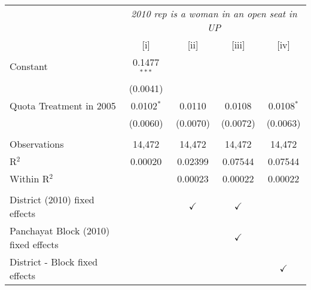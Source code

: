 
\begingroup
\centering
\begin{tabular}{lcccc}
   \toprule
    & \multicolumn{4}{c}{\textit{2010 rep is a woman in an open seat in UP}}\\
                                        & [i]            & [ii]          & [iii]         & [iv]\\  
   \midrule 
   Constant                             & 0.1477$^{***}$ &               &               &   \\   
                                        & (0.0041)       &               &               &   \\   
   Quota Treatment in 2005              & 0.0102$^{*}$   & 0.0110        & 0.0108        & 0.0108$^{*}$\\   
                                        & (0.0060)       & (0.0070)      & (0.0072)      & (0.0063)\\   
    \\
   Observations                         & 14,472         & 14,472        & 14,472        & 14,472\\  
   R$^2$                                & 0.00020        & 0.02399       & 0.07544       & 0.07544\\  
   Within R$^2$                         &                & 0.00023       & 0.00022       & 0.00022\\  
    \\
   District (2010) fixed effects        &                & $\checkmark$  & $\checkmark$  & \\  
   Panchayat Block (2010) fixed effects &                &               & $\checkmark$  & \\  
   District - Block fixed effects       &                &               &               & $\checkmark$\\   
   \bottomrule
\end{tabular}
\par\endgroup


